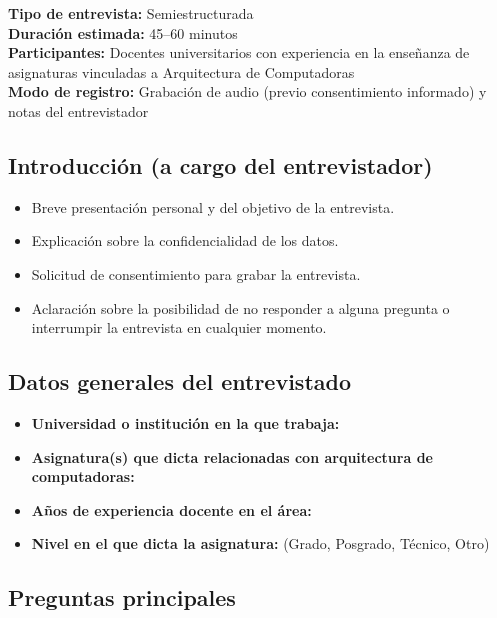 \documentclass[12pt,oneside]{templates/unerthesis}
\providecommand{\tightlist}{%
  \setlength{\itemsep}{0pt}\setlength{\parskip}{0pt}}
\begin{document}
\textbf{Tipo de entrevista:} Semiestructurada\\
\textbf{Duración estimada:} 45--60 minutos\\
\textbf{Participantes:} Docentes universitarios con experiencia en la enseñanza de asignaturas vinculadas a Arquitectura de Computadoras\\
\textbf{Modo de registro:} Grabación de audio (previo consentimiento informado) y notas del entrevistador

\hypertarget{introducciuxf3n-a-cargo-del-entrevistador}{%
\subsection{Introducción (a cargo del entrevistador)}\label{introducciuxf3n-a-cargo-del-entrevistador}}

\begin{itemize}
\tightlist
\item
  Breve presentación personal y del objetivo de la entrevista.
\item
  Explicación sobre la confidencialidad de los datos.
\item
  Solicitud de consentimiento para grabar la entrevista.
\item
  Aclaración sobre la posibilidad de no responder a alguna pregunta o interrumpir la entrevista en cualquier momento.
\end{itemize}

\hypertarget{datos-generales-del-entrevistado}{%
\subsection{Datos generales del entrevistado}\label{datos-generales-del-entrevistado}}

\begin{itemize}
\tightlist
\item
  \textbf{Universidad o institución en la que trabaja:}
\item
  \textbf{Asignatura(s) que dicta relacionadas con arquitectura de computadoras:}
\item
  \textbf{Años de experiencia docente en el área:}
\item
  \textbf{Nivel en el que dicta la asignatura:} (Grado, Posgrado, Técnico, Otro)
\end{itemize}

\hypertarget{preguntas-principales}{%
\subsection{Preguntas principales}\label{preguntas-principales}}
\end{document}
